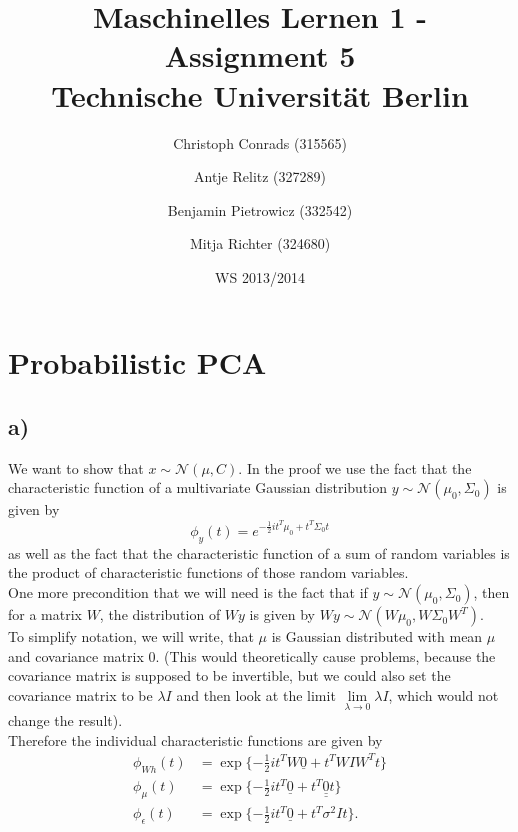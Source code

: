 \documentclass[paper=a4,fontsize=10pt,DIV11,BCOR10mm]{scrartcl}
\begin{document}
\title{Maschinelles Lernen 1 - Assignment 5\\
\small{Technische Universität Berlin}}


\author{\small{Christoph Conrads (315565)}\and \small{Antje Relitz (327289)}  \and \small{Benjamin Pietrowicz (332542)} \and \small{Mitja Richter (324680)} }

\date{WS 2013/2014}

\maketitle


\section{Probabilistic PCA}
\subsection*{a)}
We want to show that $x \sim \mathcal{N}(\mu,C)$. In the proof we use the fact that the characteristic function of a multivariate Gaussian distribution $y \sim \mathcal{N}(\mu_0,\Sigma_0)$ is given by 
\begin{equation*}
\phi_y(t)=e^{-\frac{1}{2}i t^T \mu_0 + t^T \Sigma_0 t}
\end{equation*}
as well as the fact that the characteristic function of a sum of random variables is the product of characteristic functions of those random variables.\\

One more precondition that we will need is the fact that if $y \sim \mathcal{N}(\mu_0,\Sigma_0)$, then for a matrix $W$, the distribution of $Wy$ is given by $Wy \sim \mathcal{N}(W\mu_0,W\Sigma_0W^T)$.\\

To simplify notation, we will write, that $\mu$ is Gaussian distributed with mean $\mu$ and covariance matrix \underline{\underline{$0$}}. (This would theoretically cause problems, because the covariance matrix is supposed to be invertible, but we could also set the covariance matrix to be $\lambda I$ and then look at the limit $\lim\limits_{\lambda \rightarrow 0}\lambda I$, which would not change the result).\\

Therefore the individual characteristic functions are given by
\begin{align*}
\phi_{Wh}(t) &= \exp\{{-\frac{1}{2}i t^T W\underline{0} + t^T W I W^T t}\}\\
\phi_\mu(t) &= \exp\{{-\frac{1}{2}i t^T \underline{0} + t^T \underline{\underline{0}} t}\}\\
\phi_\epsilon(t) &= \exp \{{-\frac{1}{2}i t^T \underline{0} + t^T \sigma^2 I t}\}\text{.}\\
\end{align*}
\end{document}
